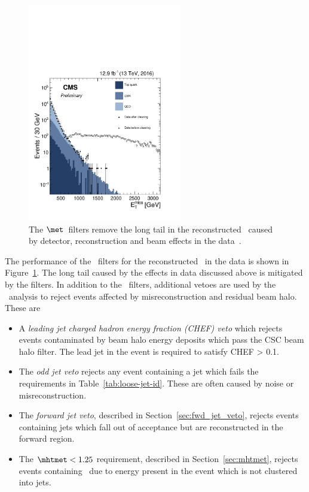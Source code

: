 \begin{figure}
\centering
    \includegraphics[width=0.6\textwidth]{./Figures/alphat/met_clean}
  \caption{\label{fig:met_filter} The $\met$~filters remove the long tail in the reconstructed \met~caused by detector, reconstruction
  and beam effects in the data~\cite{met_fig}.} 
\end{figure}
The performance of the \met~filters for the reconstructed \met~in the data is shown in Figure~\ref{fig:met_filter}. The long tail caused by
the effects in data discussed above is mitigated by the filters. In addition to the \met~filters, 
additional vetoes are used by the \alphat~analysis to reject events affected by misreconstruction and residual beam halo. These are
\begin{itemize}
\item A \emph{leading jet charged hadron energy fraction (CHEF) veto} which rejects events 
contaminated by beam halo energy deposits which pass the CSC beam halo filter. The lead jet 
in the event is required to satisfy CHEF > 0.1.
\item The \emph{odd jet veto} rejects any event containing a jet which fails the 
requirements in Table~\ref{tab:loose-jet-id}. These are often caused by noise or misreconstruction.
\item The \emph{forward jet veto}, described in Section~\ref{sec:fwd_jet_veto}, rejects events containing jets which fall out of acceptance but
are reconstructed in the forward region. 
\item The $\mhtmet < 1.25$ requirement, described in Section~\ref{sec:mhtmet}, rejects events containing 
\mht~due to energy present in the event which is not clustered into jets. 
\end{itemize}

